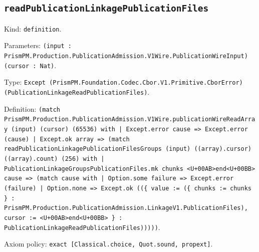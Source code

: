\documentclass[11pt]{article}
\begin{document}
\subsection*{\texttt{readPublicationLinkagePublicationFiles}}
\noindent Kind: \texttt{definition}.\par
\noindent Parameters: \texttt{(input : PrismPM.Production.PublicationAdmission.V1Wire.PublicationWireInput) (cursor : Nat)}.\par
\noindent Type: \texttt{Except (PrismPM.Foundation.Codec.Cbor.V1.Primitive.CborError) (PublicationLinkageReadPublicationFiles)}.\par
\noindent Definition: \texttt{(match PrismPM.Production.PublicationAdmission.V1Wire.publicationWireReadArray (input) (cursor) (65536) with | Except.error cause => Except.error (cause) | Except.ok array => (match readPublicationLinkagePublicationFilesGroups (input) ((array).cursor) ((array).count) (256) with | PublicationLinkageGroupsPublicationFiles.mk chunks <U+00AB>end<U+00BB> cause => (match cause with | Option.some failure => Except.error (failure) | Option.none => Except.ok ((\{ value := (\{ chunks := chunks \} : PrismPM.Production.PublicationAdmission.LinkageV1.PublicationFiles), cursor := <U+00AB>end<U+00BB> \} : PublicationLinkageReadPublicationFiles)))))}.\par
\noindent Axiom policy: \texttt{exact [Classical.choice, Quot.sound, propext]}.\par
\end{document}

